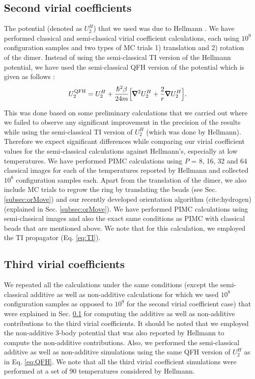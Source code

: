    \subsection{Second virial coefficients}
    \label{subsubsec:b2n2}
        The \abinitio{} potential (denoted as $U_2^H$) that we used was due to Hellmann \cite{Hellmann2013}. We have performed classical and semi-classical virial coefficient calculations, each using $10^9$ configuration samples and two types of MC trials 1) translation and 2) rotation of the dimer. Instead of using the semi-classical TI version of the Hellmann potential, we have used the semi-classical QFH version of the potential which is given as follows \cite{Feynman,Schenter2002}:
        \begin{equation}
        \label{eq:QFH}
            U_2^{\rm QFH} = U_2^H + \displaystyle\frac{\hbar^2 \beta}{24 m} \Big[ \pmb{\nabla}^2 U_2^H + \frac{2}{r} \pmb{\nabla} U_2^H \Big].
        \end{equation}

        This was done based on some preliminary calculations that we carried out where we failed to observe any significant improvement in the precision of the results while using the semi-classical TI version of $U_2^H$ (which was done by Hellmann). Therefore we expect significant differences while comparing our virial coefficient values for the semi-classical calculations against Hellmann's, especially at low temperatures. We have performed PIMC calculations using $P$ = 8, 16, 32 and 64 classical images for each of the temperatures reported by Hellmann and collected $10^8$ configuration samples each. Apart from the translation of the dimer, we also include MC trials to regrow the ring by translating the beads (see Sec. \ref{subsec:orMove}) and our recently developed orientation algorithm (cite:hydrogen) (explained in Sec. \ref{subsec:orMove}). We have performed PIMC calculations using semi-classical images and also the exact same conditions as PIMC with classical beads that are mentioned above. We note that for this calculation, we employed the TI propagator (Eq. \eqref{eq:TI}).

    \subsection{Third virial coefficients}
        We repeated all the calculations under the same conditions (except the semi-classical additive as well as non-additive calculations for which we used $10^8$ configuration samples as opposed to $10^9$ for the second virial coefficient case) that were explained in Sec. \ref{subsubsec:b2n2} for computing the additive as well as non-additive contributions to the third virial coefficients. It should be noted that we employed the non-additive 3-body potential that was also reported by Hellmann \cite{Hellmann2013} to compute the non-additive contributions. Also, we performed the semi-classical additive as well as non-additive simulations using the same QFH version of $U_2^H$ as in Eq. \eqref{eq:QFH}. We note that all the third virial coefficient simulations were performed at a set of 90 temperatures considered by Hellmann.

